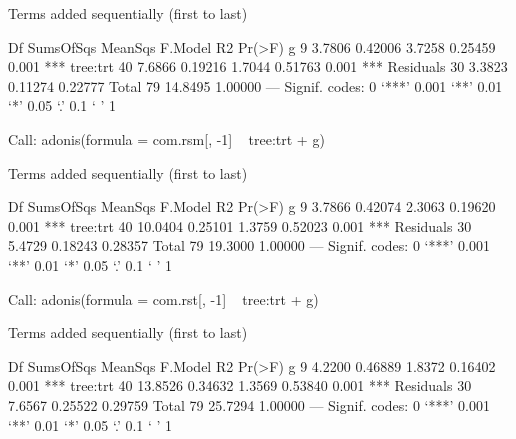 \documentclass[12pt]{article}
\begin{document}
\begin{Schunk}
\begin{Soutput}
Terms added sequentially (first to last)

          Df SumsOfSqs MeanSqs F.Model      R2 Pr(>F)    
g          9    3.7806 0.42006  3.7258 0.25459  0.001 ***
tree:trt  40    7.6866 0.19216  1.7044 0.51763  0.001 ***
Residuals 30    3.3823 0.11274         0.22777           
Total     79   14.8495                 1.00000           
---
Signif. codes:  0 ‘***’ 0.001 ‘**’ 0.01 ‘*’ 0.05 ‘.’ 0.1 ‘ ’ 1 
\end{Soutput}
\begin{Soutput}
Call:
adonis(formula = com.rsm[, -1] ~ tree:trt + g) 

Terms added sequentially (first to last)

          Df SumsOfSqs MeanSqs F.Model      R2 Pr(>F)    
g          9    3.7866 0.42074  2.3063 0.19620  0.001 ***
tree:trt  40   10.0404 0.25101  1.3759 0.52023  0.001 ***
Residuals 30    5.4729 0.18243         0.28357           
Total     79   19.3000                 1.00000           
---
Signif. codes:  0 ‘***’ 0.001 ‘**’ 0.01 ‘*’ 0.05 ‘.’ 0.1 ‘ ’ 1 
\end{Soutput}
\begin{Soutput}
Call:
adonis(formula = com.rst[, -1] ~ tree:trt + g) 

Terms added sequentially (first to last)

          Df SumsOfSqs MeanSqs F.Model      R2 Pr(>F)    
g          9    4.2200 0.46889  1.8372 0.16402  0.001 ***
tree:trt  40   13.8526 0.34632  1.3569 0.53840  0.001 ***
Residuals 30    7.6567 0.25522         0.29759           
Total     79   25.7294                 1.00000           
---
Signif. codes:  0 ‘***’ 0.001 ‘**’ 0.01 ‘*’ 0.05 ‘.’ 0.1 ‘ ’ 1 
\end{Soutput}
\end{Schunk}
\end{document}
